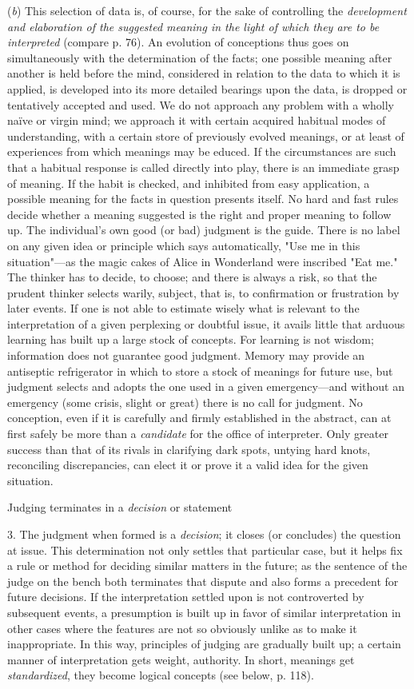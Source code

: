 \documentclass[letterpaper]{book}
\begin{document}
(\emph{b}) This selection of data is, of course, for the sake of
controlling the \emph{development and elaboration of the suggested
meaning in the light of which they are to be interpreted} (compare p.
76). An evolution of conceptions thus goes on simultaneously with the
determination of the facts; one possible meaning after another is held
before the mind, considered in relation to the data to which it is
applied, is developed into its more detailed bearings upon the data, is
dropped or tentatively accepted and used. We do not approach any problem
with a wholly naïve or virgin mind; we approach it with certain acquired
habitual modes of understanding, with a certain store of previously
evolved meanings, or at least of experiences from which meanings may be
educed. If the circumstances are such that a habitual response is called
directly into play, there is an immediate grasp of meaning. If the habit
is checked, and inhibited from easy application, a possible meaning for
the facts in question presents itself. No hard and fast rules decide
whether a meaning suggested is the right and proper meaning to follow
up. The individual's own good (or bad) judgment is the guide. There is
no label on any given idea or principle which says automatically, "Use
me in this situation"---as the magic cakes of Alice in Wonderland were
inscribed "Eat me." The thinker has to decide, to choose; and there is
always a risk, so that the prudent thinker selects warily, subject, that
is, to confirmation or frustration by later events. If one is not able
to estimate wisely what is relevant to the interpretation of a given
perplexing or doubtful issue, it
avails
little that arduous learning has built up a large stock of concepts. For
learning is not wisdom; information does not guarantee good judgment.
Memory may provide an antiseptic refrigerator in which to store a stock
of meanings for future use, but judgment selects and adopts the one used
in a given emergency---and without an emergency (some crisis, slight or
great) there is no call for judgment. No conception, even if it is
carefully and firmly established in the abstract, can at first safely be
more than a \emph{candidate} for the office of interpreter. Only greater
success than that of its rivals in clarifying dark spots, untying hard
knots, reconciling discrepancies, can elect it or prove it a valid idea
for the given situation.

Judging terminates in a \emph{decision} or statement

3. The judgment when formed is a \emph{decision}; it closes (or
concludes) the question at issue. This determination not only settles
that particular case, but it helps fix a rule or method for deciding
similar matters in the future; as the sentence of the judge on the bench
both terminates that dispute and also forms a precedent for future
decisions. If the interpretation settled upon is not controverted by
subsequent events, a presumption is built up in favor of similar
interpretation in other cases where the features are not so obviously
unlike as to make it inappropriate. In this way, principles of judging
are gradually built up; a certain manner of interpretation gets weight,
authority. In short, meanings get \emph{standardized}, they become
logical concepts (see below, p. 118).
\end{document}
